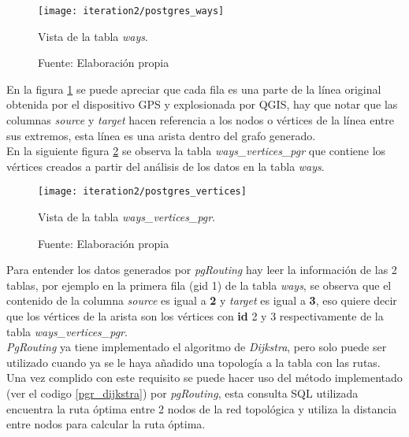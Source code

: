 \begin{figure}[H]
 \begin{center}
   \texttt{[image: iteration2/postgres\_ways]}
   \caption{Vista de la tabla \emph{ways}.}
   \label{fig:postgres_ways}
   \caption*{Fuente: Elaboración propia}
 \end{center}
\end{figure}

En la figura \ref{fig:postgres_ways} se puede apreciar que cada fila es una parte de la línea original obtenida por el dispositivo GPS y explosionada por QGIS, hay que notar que las columnas \emph{source} y \emph{target} hacen referencia a los nodos o vértices de la línea entre sus extremos, esta línea es una arista dentro del grafo generado.\\

En la siguiente figura \ref{fig:postgres_vertices} se observa la tabla \emph{ways\_vertices\_pgr} que contiene los vértices creados a partir del análisis de los datos en la tabla \emph{ways}.

\begin{figure}[H]
 \begin{center}
   \texttt{[image: iteration2/postgres\_vertices]}
   \caption{Vista de la tabla \emph{ways\_vertices\_pgr}.}
   \label{fig:postgres_vertices}
   \caption*{Fuente: Elaboración propia}
 \end{center}
\end{figure}

Para entender los datos generados por \emph{pgRouting} hay leer la información de las 2 tablas, por ejemplo en la primera  fila (gid 1) de la tabla \emph{ways}, se observa que el contenido de la columna \emph{source} es igual a \textbf{2} y \emph{target} es igual a \textbf{3}, eso quiere decir que los vértices de la arista son los vértices con \textbf{id} 2 y 3 respectivamente de la tabla \emph{ways\_vertices\_pgr}.\\


\emph{PgRouting} ya tiene implementado el algoritmo de \emph{Dijkstra}, pero solo puede ser utilizado cuando ya se le haya añadido una topología a la tabla con las rutas. Una vez complido con este requisito se puede hacer uso del método implementado (ver el codigo \ref{pgr_dijkstra}) por \emph{pgRouting}, esta consulta SQL utilizada encuentra la ruta óptima entre 2 nodos de la red topológica y utiliza la distancia entre nodos para calcular la ruta óptima.\\

